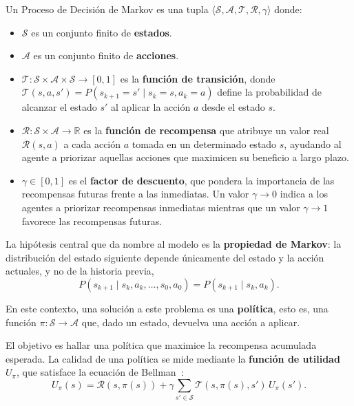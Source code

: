 \begin{definicion}[MDP] \label{def:mdp} 
Un Proceso de Decisión de Markov es una tupla $\langle\mathcal{S},\mathcal{A},\mathcal{T},\mathcal{R},\gamma\rangle$ donde: 
\begin{itemize}   
    \item $\mathcal{S}$ es un conjunto finito de \textbf{estados}.   
    
    \item $\mathcal{A}$ es un conjunto finito de \textbf{acciones}.   
    \item $\mathcal{T}:\mathcal{S}\times\mathcal{A}\times\mathcal{S}\to[0,1]$ es la \textbf{función de transición}, donde $\mathcal{T}(s,a,s')=P(s_{k+1}=s'\mid s_k=s,a_k=a)$ define la probabilidad de alcanzar el estado $s'$ al aplicar la acción $a$ desde el estado $s$.
    
    \item $\mathcal{R}:\mathcal{S}\times\mathcal{A}\to\mathbb{R}$ es la \textbf{función de recompensa} que atribuye un valor real $\mathcal{R}(s,a)$ a cada acción $a$ tomada en un determinado estado $s$, ayudando al agente a priorizar aquellas acciones que maximicen su beneficio a largo plazo.
    
    \item $\gamma\in[0,1]$ es el \textbf{factor de descuento}, que pondera la importancia de las recompensas futuras frente a las inmediatas. Un valor $\gamma \to 0$ indica a los agentes a priorizar recompensas inmediatas mientras que un valor $\gamma \to 1$ favorece las recompensas futuras.
\end{itemize} 
\end{definicion}

La hipótesis central que da nombre al modelo es la \textbf{propiedad de Markov}: la distribución del estado siguiente depende únicamente del estado y la acción actuales, y no de la historia previa, \begin{equation} 
P(s_{k+1}\mid s_k,a_k,\dots,s_0,a_0)=P(s_{k+1}\mid s_k,a_k). 
\end{equation} 

En este contexto, una solución a este problema es una \textbf{política}, esto es, una función $\pi : \mathcal{S} \to \mathcal{A}$ que, dado un estado, devuelva una acción a aplicar.

El objetivo es hallar una política que maximice la recompensa acumulada esperada. La calidad de una política se mide mediante la \textbf{función de utilidad} $U_\pi$, que satisface la ecuación de Bellman~\cite{bellman1957dynamic}: 
\begin{equation} \label{eq:bellman} 
U_\pi(s)=\mathcal{R}(s,\pi(s)) +\gamma\sum_{s'\in\mathcal{S}}\mathcal{T}(s,\pi(s),s')\,U_\pi(s'). 
\end{equation}

